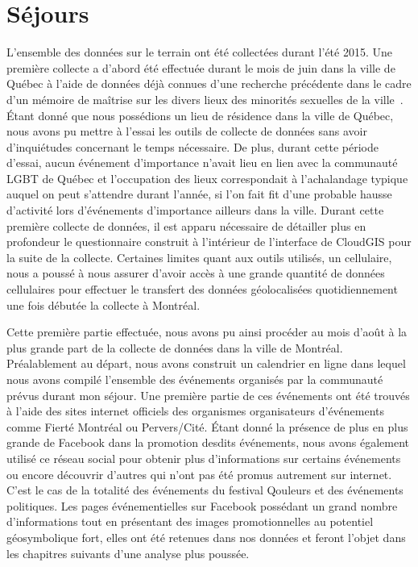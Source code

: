 \section{Séjours}
\label{sec:s_jours}
L'ensemble des données sur le terrain ont été collectées durant l'été 2015. 
Une première collecte a d'abord été effectuée durant le mois de juin dans la ville de Québec à l'aide de données déjà connues d'une recherche précédente dans le cadre d'un mémoire de maîtrise sur les divers lieux des minorités sexuelles de la ville~\citep{Vachon2014}. 
Étant donné que nous possédions un lieu de résidence dans la ville de Québec, nous avons pu mettre à l'essai les outils de collecte de données sans avoir d'inquiétudes concernant le temps nécessaire. 
De plus, durant cette période d'essai, aucun événement d'importance n'avait lieu en lien avec la communauté LGBT de Québec et l'occupation des lieux correspondait à l'achalandage typique auquel on peut s'attendre durant l'année, si l'on fait fit d'une probable hausse d'activité lors d'événements d'importance ailleurs dans la ville. 
Durant cette première collecte de données, il est apparu nécessaire de détailler plus en profondeur le questionnaire construit à l'intérieur de l'interface de CloudGIS pour la suite de la collecte. 
Certaines limites quant aux outils utilisés, un cellulaire, nous a poussé à nous assurer d'avoir accès à une grande quantité de données cellulaires pour effectuer le transfert des données géolocalisées quotidiennement une fois débutée la collecte à Montréal.

Cette première partie effectuée, nous avons pu ainsi procéder au mois d'août à la plus grande part de la collecte de données dans la ville de Montréal.
Préalablement au départ, nous avons construit un calendrier en ligne dans lequel nous avons compilé l'ensemble des événements organisés par la communauté \lgbt{} prévus durant mon séjour. 
Une première partie de ces événements ont été trouvés à l'aide des sites internet officiels des organismes organisateurs d'événements comme Fierté Montréal ou Pervers/Cité. 
Étant donné la présence de plus en plus grande de Facebook dans la promotion desdits événements, nous avons également utilisé ce réseau social pour obtenir plus d'informations sur certains événements ou encore découvrir d'autres qui n'ont pas été promus autrement sur  internet. 
C'est le cas de la totalité des événements du festival Qouleurs et des événements politiques. 
Les pages événementielles sur Facebook possédant un grand nombre d'informations tout en présentant des images promotionnelles au potentiel géosymbolique fort, elles ont été retenues dans nos données et feront l'objet dans les chapitres suivants d'une analyse plus poussée.

